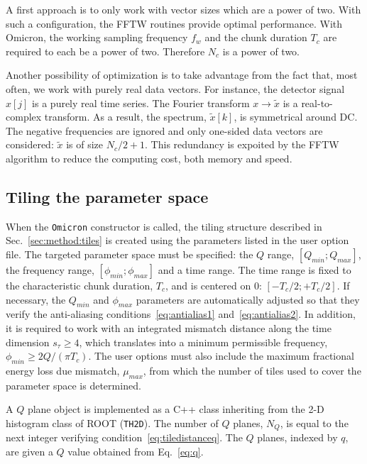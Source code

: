 A first approach is to only work with vector sizes which are a power of two. With such a configuration, the FFTW routines provide optimal performance. With Omicron, the working sampling frequency $f_w$ and the chunk duration $T_c$ are required to each be a power of two. Therefore $N_c$ is a power of two.

Another possibility of optimization is to take advantage from the fact that, most often, we work with purely real data vectors. For instance, the detector signal $x[j]$ is a purely real time series. The Fourier transform $x\rightarrow\tilde{x}$ is a real-to-complex transform. As a result, the spectrum, $\tilde{x}[k]$, is symmetrical around DC. The negative frequencies are ignored and only one-sided data vectors are considered: $\tilde{x}$ is of size $N_c/2+1$. This redundancy is expoited by the FFTW algorithm to reduce the computing cost, both memory and speed.



\subsection{Tiling the parameter space} \label{sec:algorithm:tiling}

When the \texttt{Omicron} constructor is called, the tiling structure described in Sec.~\ref{sec:method:tiles} is created using the parameters listed in the user option file. The targeted parameter space must be specified: the $Q$ range, $[Q_{min}; Q_{max}]$, the frequency range, $[\phi_{min}; \phi_{max}]$ and a time range. The time range is fixed to the characteristic chunk duration, $T_c$, and is centered on 0: $[-T_c/2; +T_c/2]$. If necessary, the $Q_{min}$ and $\phi_{max}$ parameters are automatically adjusted so that they verify the anti-aliasing conditions~\ref{eq:antialias1} and~\ref{eq:antialias2}. In addition, it is required to work with an integrated mismatch distance along the time dimension $s_\tau\ge4$, which translates into a minimum permissible frequency, $\phi_{min} \ge 2Q/(\pi T_c)$.
The user options must also include the maximum fractional energy loss due mismatch, $\mu_{max}$, from which the number of tiles used to cover the parameter space is determined.

A $Q$ plane object is implemented as a C++ class inheriting from the 2-D histogram class of ROOT (\texttt{TH2D}). The number of $Q$ planes, $N_Q$, is equal to the next integer verifying condition~\ref{eq:tiledistanceq}. The $Q$ planes, indexed by $q$, are given a $Q$ value obtained from Eq.~\ref{eq:q}.

